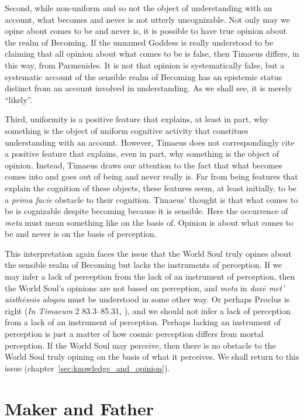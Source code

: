 Second, while non-uniform and so not the object of understanding with an account, what becomes and never is not utterly uncognizable. Not only may we opine about comes to be and never is, it is possible to have true opinion about the realm of Becoming. If the unnamed Goddess is really understood to be claiming that all opinion about what comes to be is false, then Timaeus differs, in this way, from Parmenides. It is not that opinion is systematically false, but a systematic account of the sensible realm of Becoming has an epistemic status distinct from an account involved in understanding. As we shall see, it is merely ``likely''.

Third, uniformity is a positive feature that explains, at least in part, why something is the object of uniform cognitive activity that constitues understanding with an account. However, Timaeus does not correspondingly cite a positive feature that explains, even in part, why something is the object of opinion. Instead, Timaeus draws our attention to the fact that what becomes comes into and goes out of being and never really is. Far from being features that explain the cognition of these objects, these features seem, at least initially, to be a \emph{prima facie} obstacle to their cognition. Timaeus' thought is that what comes to be is cognizable despite becoming because it is sensible. Here the occurrence of \emph{meta} must mean something like on the basis of. Opinion is about what comes to be and never is on the basis of perception.

This interpretation again faces the issue that the World Soul truly opines about the sensible realm of Becoming but lacks the instruments of perception. If we may infer a lack of perception from the lack of an instrument of perception, then the World Soul's opinions are not based on perception, and \emph{meta} in \emph{doxē met’ aisthēseōs alogou} must be understood in some other way. Or perhaps Proclus is right (\emph{In Timaeum} 2 83.3–85.31, \citealt{Diehl:1903re}), and we should not infer a lack of perception from a lack of an instrument of perception. Perhaps lacking an instrument of perception is just a matter of how cosmic perception differs from mortal perception. If the World Soul may perceive, then there is no obstacle to the World Soul truly opining on the basis of what it perceives. We shall return to this issue (chapter~\ref{sec:knowledge_and_opinion}).


\section{Maker and Father} %
\label{sec:maker_and_father}



